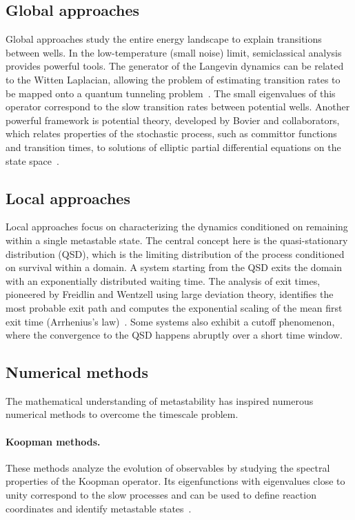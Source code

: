 \subsection{Global approaches}
Global approaches study the entire energy landscape to explain transitions between wells. In the low-temperature (small noise) limit, semiclassical analysis provides powerful tools. The generator of the Langevin dynamics can be related to the Witten Laplacian, allowing the problem of estimating transition rates to be mapped onto a quantum tunneling problem~\cite{BLS25a}. The small eigenvalues of this operator correspond to the slow transition rates between potential wells. Another powerful framework is potential theory, developed by Bovier and collaborators, which relates properties of the stochastic process, such as committor functions and transition times, to solutions of elliptic partial differential equations on the state space~\cite{BLS25a}.

\subsection{Local approaches}
Local approaches focus on characterizing the dynamics conditioned on remaining within a single metastable state. The central concept here is the quasi-stationary distribution (QSD), which is the limiting distribution of the process conditioned on survival within a domain. A system starting from the QSD exits the domain with an exponentially distributed waiting time. The analysis of exit times, pioneered by Freidlin and Wentzell using large deviation theory, identifies the most probable exit path and computes the exponential scaling of the mean first exit time (Arrhenius's law)~\cite{BLS25a}. Some systems also exhibit a cutoff phenomenon, where the convergence to the QSD happens abruptly over a short time window.

\subsection{Numerical methods}
The mathematical understanding of metastability has inspired numerous numerical methods to overcome the timescale problem.
\paragraph{Koopman methods.} These methods analyze the evolution of observables by studying the spectral properties of the Koopman operator. Its eigenfunctions with eigenvalues close to unity correspond to the slow processes and can be used to define reaction coordinates and identify metastable states~\cite{BLS25a}.

